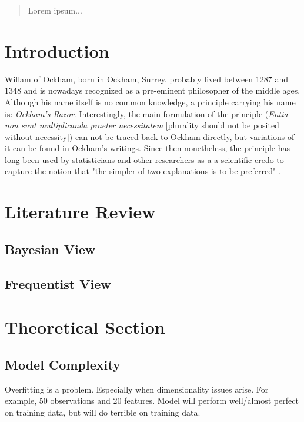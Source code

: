 \documentclass[12pt,a4paper]{article}
\begin{document}
\begin{abstract}
Lorem ipsum...
\end{abstract}

\clearpage
\thispagestyle{plain}
\tableofcontents
\pagebreak
{}

\pagebreak
\section{Introduction}
Willam of Ockham, born in Ockham, Surrey, probably lived between 1287 and 1348 and is nowadays recognized as a pre-eminent philosopher of the middle ages. Although     his name itself is no common knowledge, a principle carrying his name is: \textit{Ockham's Razor}. Interestingly, the main formulation of the principle (\textit{Entia non sunt multiplicanda praeter necessitatem} [plurality should not be posited without necessity]) can not be traced back to Ockham directly, but variations of it can be found in Ockham's writings. Since then nonetheless, the principle has long been used by statisticians and other researchers as a a scientific credo to capture the notion that "the simpler of two explanations is to be preferred" \parencite{Lazar2010}.  


\section{Literature Review}
\subsection{Bayesian View}
\subsection{Frequentist View}


\section{Theoretical Section}\label{sec:theorysuper}
\subsection{Model Complexity}
Overfitting is a problem. Especially when dimensionality issues arise. For example, 50 observations and 20 features. Model will perform well/almost perfect on training data, but will do terrible on training data.\\
\end{document}
